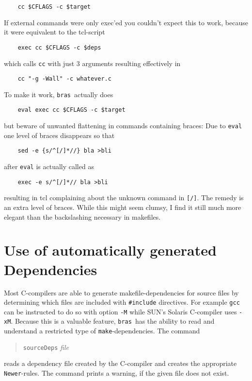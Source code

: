 \documentclass[12pt]{article}
\newcommand{\bras}{\texttt{bras}}
\newcommand{\make}{\texttt{make}}
\begin{document}
\begin{verbatim}
    cc $CFLAGS -c $target
\end{verbatim}

If external commands were only exec'ed you couldn't expect this to
work, because it were equivalent to the tcl-script

\begin{verbatim}
    exec cc $CFLAGS -c $deps
\end{verbatim}

which calls \texttt{cc} with just 3 arguments resulting effectively in

\begin{verbatim}
    cc "-g -Wall" -c whatever.c
\end{verbatim}

To make it work, \bras\ actually does

\begin{verbatim}
    eval exec cc $CFLAGS -c $target
\end{verbatim}

but beware of unwanted flattening in commands containing braces: Due
to \texttt{eval} one level of braces
disappears so that

\begin{verbatim}
    sed -e {s/^[/]*//} bla >bli
\end{verbatim}

after \texttt{eval} is actually called as

\begin{verbatim}
    exec -e s/^[/]*// bla >bli
\end{verbatim}

resulting in tcl complaining about the unknown command in
\texttt{[/]}. The remedy is an extra level of braces. While this might
seem clumsy, I find it still much more elegant than the backslashing
necessary in makefiles.



\section{Use of automatically generated Dependencies}

Most C-compilers are able to generate makefile-dependencies for
source files by determining which files are included with
\texttt{\#include} directives. For example \texttt{gcc} can be
instructed to do so with option \texttt{-M} while SUN's Solaris
C-compiler uses \texttt{-xM}. Because this is a valuable feature,
\bras\ has the ability to read and understand a restricted type of
\make-dependencies. The command
\begin{quote}
  \texttt{sourceDeps} \textit{file}
\end{quote}
reads a dependency file created by the C-compiler and creates the
appropriate \texttt{Newer}-rules. The command prints a warning, if
the given file does not exist.
   
\end{document}
